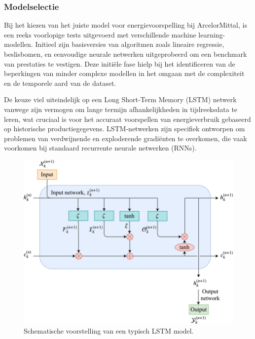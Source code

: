 \subsubsection{Modelselectie}
Bij het kiezen van het juiste model voor energievoorspelling bij ArcelorMittal, is een reeks voorlopige tests uitgevoerd met verschillende machine learning-modellen. Initieel zijn basisversies van algoritmen zoals lineaire regressie, beslisbomen, en eenvoudige neurale netwerken uitgeprobeerd om een benchmark van prestaties te vestigen. Deze initiële fase hielp bij het identificeren van de beperkingen van minder complexe modellen in het omgaan met de complexiteit en de temporele aard van de dataset.

De keuze viel uiteindelijk op een Long Short-Term Memory (LSTM) netwerk vanwege zijn vermogen om lange termijn afhankelijkheden in tijdreeksdata te leren, wat cruciaal is voor het accuraat voorspellen van energieverbruik gebaseerd op historische productiegegevens. LSTM-netwerken zijn specifiek ontworpen om problemen van verdwijnende en exploderende gradiënten te overkomen, die vaak voorkomen bij standaard recurrente neurale netwerken (RNNs).

\begin{figure}[h!]
    \centering
    \includegraphics[width=\textwidth]{graphics/LSTMSchematic.png}
    \caption{Schematische voorstelling van een typisch LSTM model.}
    \label{fig:LSTMSchematic}
\end{figure}

